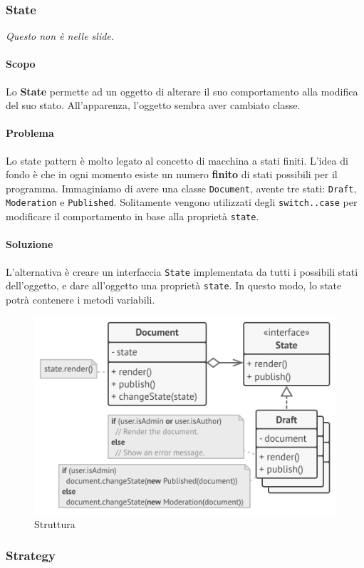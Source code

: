 \documentclass[11pt]{article}
\newcommand{\code}[1]{\texttt{#1}}
\begin{document}
\subsubsection{State}
\textit{Questo non è nelle slide.}
\paragraph{Scopo}
Lo \textbf{State} permette ad un oggetto di alterare il suo comportamento alla modifica del suo stato. All'apparenza, l'oggetto sembra aver cambiato classe.
\paragraph{Problema}
Lo state pattern è molto legato al concetto di macchina a stati finiti. L'idea di fondo è che in ogni momento esiste un numero \textbf{finito} di stati possibili per il programma. Immaginiamo di avere una classe \code{Document}, avente tre stati: \code{Draft}, \code{Moderation} e \code{Published}. Solitamente vengono utilizzati degli \code{switch..case} per modificare il comportamento in base alla proprietà \code{state}.
\paragraph{Soluzione}
L'alternativa è creare un interfaccia \code{State} implementata da tutti i possibili stati dell'oggetto, e dare all'oggetto una proprietà \code{state}. In questo modo, lo state potrà contenere i metodi variabili.  
\begin{figure}[H]
    \includegraphics[width=\linewidth]{res/teoria/State.png}
    \caption{Struttura}
\end{figure}
\subsubsection{Strategy}
\end{document}
